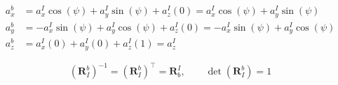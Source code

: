 \documentclass[11pt,a4paper]{article}
\begin{document}
\begin{align}
  a_x^{b} &= a_x^{I}\cos(\psi) + a_y^{I}\sin(\psi) + a_z^{I}(0)
           = a_x^{I}\cos(\psi) + a_y^{I}\sin(\psi) \\[4pt]
  a_y^{b} &= -a_x^{I}\sin(\psi) + a_y^{I}\cos(\psi) + a_z^{I}(0)
           = -a_x^{I}\sin(\psi) + a_y^{I}\cos(\psi) \\[4pt]
  a_z^{b} &= a_x^{I}(0) + a_y^{I}(0) + a_z^{I}(1) = a_z^{I}
\end{align}

\begin{equation}
  \left(\bm{R}^{b}_{I}\right)^{-1} = \left(\bm{R}^{b}_{I}\right)^{\!\top} = \bm{R}^{I}_{b},
  \qquad
  \det\!\left(\bm{R}^{b}_{I}\right) = 1
\end{equation}
\end{document}
